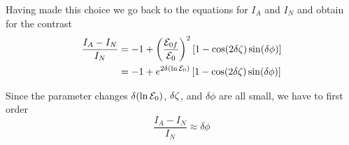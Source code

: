  

Having made this choice we go back to the equations for $I_{A}$ and $I_{N}$ and
obtain for the contrast 
\begin{equation}
\begin{split}
  \frac{ I_{A} - I_{N}}{I_{N}}  & =  
     - 1 
     + \left(\frac{ \mathcal{E}_{0f} }{\efieldo}\right)^{2} 
      \left[ 1 -\cos(2\delta\phcChi) \sin(\delta\phi)  \right] \\ 
     \vspace{0.5em}
     & = - 1 
     + e^{2\delta(\ln\efieldo)} 
      \left[ 1 -\cos(2\delta\phcChi) \sin(\delta\phi)  \right]
\end{split}
\end{equation}

Since the parameter changes $\delta(\ln\mathcal{E}_{0})$, $\delta\zeta$, and 
$\delta\phi$ are all small, we have to first order 
\begin{equation}
  \frac{ I_{A} - I_{N}}{I_{N}}  \approx  
     \delta \phi
\end{equation}

